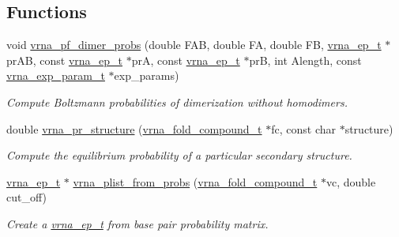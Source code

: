 \subsection*{Functions}
\begin{DoxyCompactItemize}
\item 
void \hyperlink{group__part__func__global_gaa1e39e73afb51fbaf4ae38f0c066c46b}{vrna\+\_\+pf\+\_\+dimer\+\_\+probs} (double F\+AB, double FA, double FB, \hyperlink{group__struct__utils__plist_gab9ac98ab55ded9fb90043b024b915aca}{vrna\+\_\+ep\+\_\+t} $\ast$pr\+AB, const \hyperlink{group__struct__utils__plist_gab9ac98ab55ded9fb90043b024b915aca}{vrna\+\_\+ep\+\_\+t} $\ast$prA, const \hyperlink{group__struct__utils__plist_gab9ac98ab55ded9fb90043b024b915aca}{vrna\+\_\+ep\+\_\+t} $\ast$prB, int Alength, const \hyperlink{group__energy__parameters_ga01d8b92fe734df8d79a6169482c7d8d8}{vrna\+\_\+exp\+\_\+param\+\_\+t} $\ast$exp\+\_\+params)
\begin{DoxyCompactList}\small\item\em Compute Boltzmann probabilities of dimerization without homodimers. \end{DoxyCompactList}\item 
double \hyperlink{group__part__func__global_ga882c35d9dd775c1275593b3b6a966bec}{vrna\+\_\+pr\+\_\+structure} (\hyperlink{group__fold__compound_ga1b0cef17fd40466cef5968eaeeff6166}{vrna\+\_\+fold\+\_\+compound\+\_\+t} $\ast$fc, const char $\ast$structure)
\begin{DoxyCompactList}\small\item\em Compute the equilibrium probability of a particular secondary structure. \end{DoxyCompactList}\item 
\hyperlink{group__struct__utils__plist_gab9ac98ab55ded9fb90043b024b915aca}{vrna\+\_\+ep\+\_\+t} $\ast$ \hyperlink{group__part__func__global_ga94f6efc0b8d8712b023452794a0a5bd2}{vrna\+\_\+plist\+\_\+from\+\_\+probs} (\hyperlink{group__fold__compound_ga1b0cef17fd40466cef5968eaeeff6166}{vrna\+\_\+fold\+\_\+compound\+\_\+t} $\ast$vc, double cut\+\_\+off)
\begin{DoxyCompactList}\small\item\em Create a \hyperlink{group__struct__utils__plist_gab9ac98ab55ded9fb90043b024b915aca}{vrna\+\_\+ep\+\_\+t} from base pair probability matrix. \end{DoxyCompactList}\end{DoxyCompactItemize}
